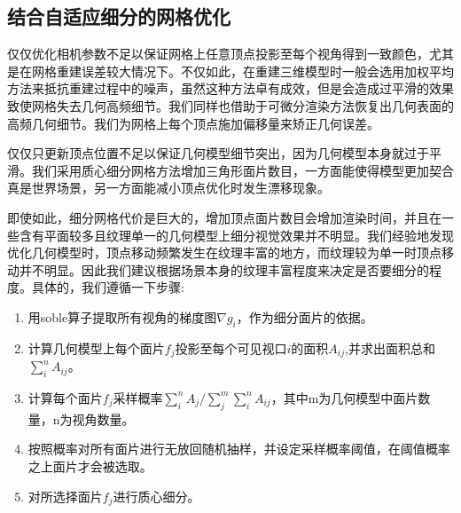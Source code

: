 \subsection{结合自适应细分的网格优化}
仅仅优化相机参数不足以保证网格上任意顶点投影至每个视角得到一致颜色，尤其是在网格重建误差较大情况下。不仅如此，在重建三维模型时一般会选用加权平均方法来抵抗重建过程中的噪声，虽然这种方法卓有成效，但是会造成过平滑的效果致使网格失去几何高频细节。我们同样也借助于可微分渲染方法恢复出几何表面的高频几何细节。我们为网格上每个顶点施加偏移量来矫正几何误差。\par
仅仅只更新顶点位置不足以保证几何模型细节突出，因为几何模型本身就过于平滑。我们采用质心细分网格方法增加三角形面片数目，一方面能使得模型更加契合真是世界场景，另一方面能减小顶点优化时发生漂移现象。\par
即使如此，细分网格代价是巨大的，增加顶点面片数目会增加渲染时间，并且在一些含有平面较多且纹理单一的几何模型上细分视觉效果并不明显。我们经验地发现优化几何模型时，顶点移动频繁发生在纹理丰富的地方，而纹理较为单一时顶点移动并不明显。因此我们建议根据场景本身的纹理丰富程度来决定是否要细分的程度。具体的，我们遵循一下步骤:

\begin{enumerate}
	\item 用soble算子提取所有视角的梯度图$\nabla g_i$，作为细分面片的依据。
	\item 计算几何模型上每个面片$f_j$投影至每个可见视口$i$的面积$A_{ij}$,并求出面积总和$\sum_{i}^{n} A_{ij}$。
	\item 计算每个面片$f_j$采样概率$\sum_{i}^{n} A_{j} / \sum_{j}^{m}\sum_{i}^{n} A_{ij}$，其中m为几何模型中面片数量，n为视角数量。
	\item 按照概率对所有面片进行无放回随机抽样，并设定采样概率阈值，在阈值概率之上面片才会被选取。
	\item 对所选择面片$f_j$进行质心细分。
\end{enumerate}

